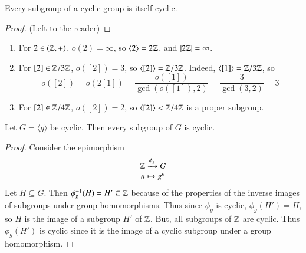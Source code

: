 \begin{theorem}
    Every subgroup of a cyclic group is itself cyclic.
    \begin{proof}
        (Left to the reader)
    \end{proof}
\end{theorem}

\begin{example}
    \leavevmode
    \begin{enumerate}
        \item For $2 \in (
        \mathbb Z,+)$, $o(2) = \infty$, so $\langle 2 \rangle = 2\mathbb Z$, and $|2\mathbb Z| = \infty$.
        \item For $[2] \in \mathbb Z/3\mathbb Z$, $o([2]) = 3$, so $\langle [2]\rangle = \mathbb Z/3\mathbb Z$. Indeed, $\langle [1]\rangle = \mathbb Z/3\mathbb Z$, so $$o([2]) = o(2[1]) = \frac{o([1])}{\gcd(o([1]),2)} = \frac{3}{\gcd(3,2)} = 3$$
        \item For $[2] \in \mathbb Z/4\mathbb Z$, $o([2]) = 2$, so $\langle [2] \rangle < \mathbb Z/4\mathbb Z$ is a proper subgroup.
    \end{enumerate}
\end{example}


\begin{corollary}
        Let $G = \langle g \rangle$ be cyclic. Then every subgroup of $G$ is cyclic.
\end{corollary}
\begin{proof}
        Consider the epimorphism \begin{equation}
                \begin{array}{c} \mathbb Z\xrightarrow{\phi_g}G \\ n\mapsto g^n \end{array}
        \end{equation}
        Let $H \subseteq G$. Then $\phi^{-1}_g(H) = H' \subseteq \mathbb Z$ because of the properties of the inverse images of subgroups under group homomorphisms. Thus since $\phi_g$ is cyclic, $\phi_g(H') = H$, so $H$ is the image of a subgroup $H'$ of $\mathbb Z$. But, all subgroups of $\mathbb Z$ are cyclic. Thus $\phi_g(H')$ is cyclic since it is the image of a cyclic subgroup under a group homomorphism.
\end{proof}


